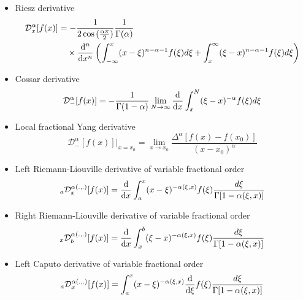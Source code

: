 \documentclass[twoside]{book}
\begin{document}
{\begin{itemize}
    \item Riesz derivative
          \begin{equation}
              \begin{split}
                  \mathcal{D}^{\alpha}_{x}[f(x)] & = - \frac{1}{2 \cos{(\frac{\alpha \pi}{2})}} \frac{1}{\Gamma{(\alpha)}}                                                                     \\
                                                 & \quad \times \dv[n]{}{x} \left( \int_{-\infty}^{x} (x-\xi)^{n-\alpha-1} f(\xi) d\xi + \int_x^\infty (\xi-x)^{n-\alpha-1}f(\xi) d\xi \right)
              \end{split}
          \end{equation}
    \item Cossar derivative
          \begin{equation}
              \mathcal{D}^{\alpha}_{-}[f(x)] = - \frac{1}{\Gamma{(1-\alpha)}} \lim_{N \to \infty} \dv{}{x} \int_x^N (\xi-x)^{-\alpha} f(\xi) d\xi
          \end{equation}
    \item Local fractional Yang derivative
          \begin{equation}
              \mathcal{D}^{\alpha}_{-}[f(x)]|_{x=x_0} = \lim_{x \to x_0} \frac{\Delta^\alpha [f(x)-f(x_0)]}{(x-x_0)^\alpha}
          \end{equation}
    \item Left Riemann-Liouville derivative of variable fractional order
          \begin{equation}
              _{a}\mathcal{D}^{\alpha(.,.)}_{x}[f(x)] = \dv{}{x} \int_a^x (x-\xi)^{-\alpha(\xi,x)} f(\xi)\frac{d\xi}{\Gamma{[1-\alpha(\xi,x)]}}
          \end{equation}
    \item Right Riemann-Liouville derivative of variable fractional order
          \begin{equation}
              _{x}\mathcal{D}^{\alpha(.,.)}_{b}[f(x)] = \dv{}{x} \int_x^b (\xi-x)^{-\alpha(\xi,x)} f(\xi)\frac{d\xi}{\Gamma{[1-\alpha(\xi,x)]}}
          \end{equation}
    \item Left Caputo derivative of variable fractional order
          \begin{equation}
              _{a}\mathcal{D}^{\alpha(.,.)}_{x}[f(x)] = \int_a^x (x-\xi)^{-\alpha(\xi,x)} \dv{}{\xi} f(\xi)\frac{d\xi}{\Gamma{[1-\alpha(\xi,x)]}}
          \end{equation}

\end{itemize}}
\end{document}
